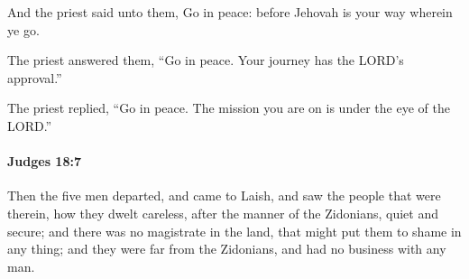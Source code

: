 			\begin{versebox}
					\item[BHS] 
					\item[ASV] And the priest said unto them, Go in peace: before Jehovah is your way wherein ye go.
					\item[NIV] The priest answered them, “Go in peace. Your journey has the LORD’s approval.”
					\item[NRSV] The priest replied, “Go in peace. The mission you are on is under the eye of the LORD.”
			\end{versebox}

		\paragraph{Judges 18:7} %
			\label{JUDGES-18-7}

			Then the five men departed, and came to Laish, and saw the people that were therein, how they dwelt careless, after the manner of the Zidonians, quiet and secure; and there was no magistrate in the land, that might put them to shame in any thing; and they were far from the Zidonians, and had no business with any man.

